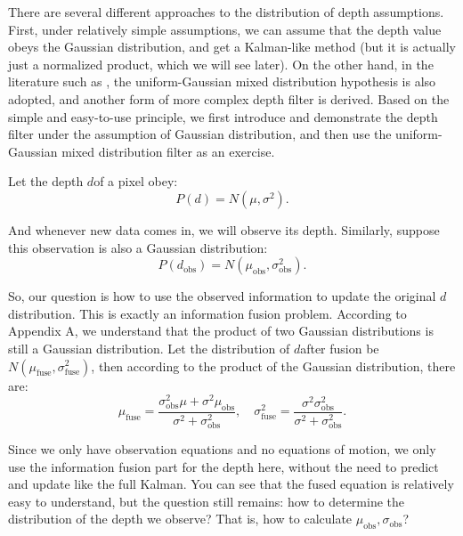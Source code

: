 There are several different approaches to the distribution of depth assumptions. First, under relatively simple assumptions, we can assume that the depth value obeys the Gaussian distribution, and get a Kalman-like method (but it is actually just a normalized product, which we will see later). On the other hand, in the literature such as \cite{Vogiatzis2011, Forster2014}, the uniform-Gaussian mixed distribution hypothesis is also adopted, and another form of more complex depth filter is derived. Based on the simple and easy-to-use principle, we first introduce and demonstrate the depth filter under the assumption of Gaussian distribution, and then use the uniform-Gaussian mixed distribution filter as an exercise.

Let the depth $d $of a pixel obey:
\begin{equation}
P(d)=N(\mu, \sigma^2).
\end{equation}

And whenever new data comes in, we will observe its depth. Similarly, suppose this observation is also a Gaussian distribution:
\begin{equation}
P(d_{\mathrm{obs}})=N(\mu_{\mathrm{obs}}, \sigma_{\mathrm{obs}}^2 ).
\end{equation}

So, our question is how to use the observed information to update the original $d $distribution. This is exactly an information fusion problem. According to Appendix A, we understand that the product of two Gaussian distributions is still a Gaussian distribution. Let the distribution of $d $after fusion be $N (\mu_{\mathrm{fuse}}, \sigma_{\mathrm{fuse}} ^ 2) $, then according to the product of the Gaussian distribution, there are:
\begin{equation}
{\mu_{\mathrm{fuse}}}=\frac{{\sigma_{\mathrm{obs}}^2\mu  + {\sigma ^2}{\mu_{\mathrm{obs}}}}}{{{\sigma ^2} + \sigma_{\mathrm{obs}}^2}},\quad \sigma_{\mathrm{fuse}}^2=\frac{{{\sigma ^2}\sigma_{\mathrm{obs}}^2}}{{{\sigma ^2} + \sigma_{\mathrm{obs}}^2}}.
\end{equation}

Since we only have observation equations and no equations of motion, we only use the information fusion part for the depth here, without the need to predict and update like the full Kalman. You can see that the fused equation is relatively easy to understand, but the question still remains: how to determine the distribution of the depth we observe? That is, how to calculate $\mu_{\mathrm{obs}}, \sigma_{\mathrm{obs}} $?

